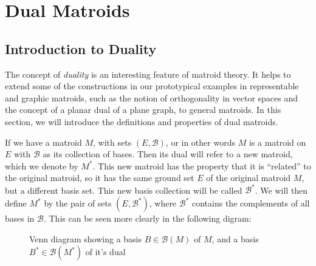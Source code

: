 \newpage
\section{Dual Matroids}

\subsection{Introduction to Duality}
The concept of \textit{duality} is an interesting feature of matroid theory. It helps to extend some of the constructions in our prototypical examples in representable and graphic matroids, such as the notion of orthogonality in vector spaces and the concept of a planar dual of a plane graph, to general matroids. In this section, we will introduce the definitions and  properties of dual matroids.



If we have a matroid $M$, with sets $(E,\mathcal{B})$, or in other words $M$ is a matroid on $E$ with $\mathcal{B}$ as its collection of bases. Then its dual will refer to a new matroid, which we denote by $M^*$. This new matroid has the property that it is ``related'' to the original matroid, so it has the same ground set $E$ of the original matroid $M$, but a different basis set. This new basis collection will be called $\mathcal{B}^*$. We will then define $M^*$ by the pair of sets $(E,\mathcal{B}^*)$, where $\mathcal{B}^*$ contains the complements of all bases in $\mathcal{B}$. This can be seen more clearly in the following digram:
\begin{figure}[H]
    \centering
{}
    \caption{Venn diagram showing a basis $B \in \mathcal B(M)$ of $M$, and a basis $B^* \in \mathcal B(M^*)$ of it's dual}%
\label{graphic}%
\end{figure}

